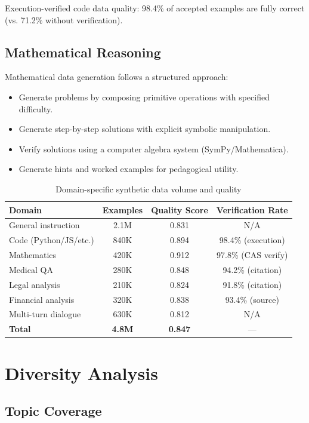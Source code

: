 \documentclass[11pt,a4paper]{article}
\begin{document}
Execution-verified code data quality: 98.4\% of accepted examples are fully correct (vs. 71.2\% without verification).

\subsection{Mathematical Reasoning}

Mathematical data generation follows a structured approach:
\begin{itemize}
  \item Generate problems by composing primitive operations with specified difficulty.
  \item Generate step-by-step solutions with explicit symbolic manipulation.
  \item Verify solutions using a computer algebra system (SymPy/Mathematica).
  \item Generate hints and worked examples for pedagogical utility.
\end{itemize}

\begin{table}[H]
\centering
\caption{Domain-specific synthetic data volume and quality}
\label{tab:domain_data}
\begin{tabular}{lccc}
\toprule
Domain & Examples & Quality Score & Verification Rate \\
\midrule
General instruction & 2.1M & 0.831 & N/A \\
Code (Python/JS/etc.) & 840K & 0.894 & 98.4\% (execution) \\
Mathematics & 420K & 0.912 & 97.8\% (CAS verify) \\
Medical QA & 280K & 0.848 & 94.2\% (citation) \\
Legal analysis & 210K & 0.824 & 91.8\% (citation) \\
Financial analysis & 320K & 0.838 & 93.4\% (source) \\
Multi-turn dialogue & 630K & 0.812 & N/A \\
\midrule
\textbf{Total} & \textbf{4.8M} & \textbf{0.847} & — \\
\bottomrule
\end{tabular}
\end{table}

\section{Diversity Analysis}

\subsection{Topic Coverage}
\end{document}
